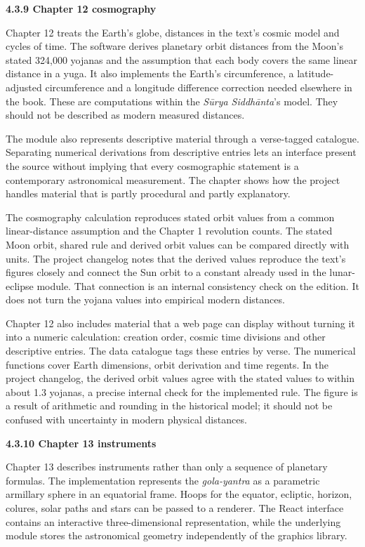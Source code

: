 \documentclass[
]{article}
\begin{document}
\textbf{4.3.9 Chapter 12 cosmography}

Chapter 12 treats the Earth's globe, distances in the text's cosmic
model and cycles of time. The software derives planetary orbit distances
from the Moon's stated 324,000 yojanas and the assumption that each body
covers the same linear distance in a yuga. It also implements the
Earth's circumference, a latitude-adjusted circumference and a longitude
difference correction needed elsewhere in the book. These are
computations within the \emph{Sūrya Siddhānta}'s model. They should not
be described as modern measured distances.

The module also represents descriptive material through a verse-tagged
catalogue. Separating numerical derivations from descriptive entries
lets an interface present the source without implying that every
cosmographic statement is a contemporary astronomical measurement. The
chapter shows how the project handles material that is partly procedural
and partly explanatory.

The cosmography calculation reproduces stated orbit values from a common
linear-distance assumption and the Chapter 1 revolution counts. The
stated Moon orbit, shared rule and derived orbit values can be compared
directly with units. The project changelog notes that the derived values
reproduce the text's figures closely and connect the Sun orbit to a
constant already used in the lunar-eclipse module. That connection is an
internal consistency check on the edition. It does not turn the yojana
values into empirical modern distances.

Chapter 12 also includes material that a web page can display without
turning it into a numeric calculation: creation order, cosmic time
divisions and other descriptive entries. The data catalogue tags these
entries by verse. The numerical functions cover Earth dimensions, orbit
derivation and time regents. In the project changelog, the derived orbit
values agree with the stated values to within about 1.3 yojanas, a
precise internal check for the implemented rule. The figure is a result
of arithmetic and rounding in the historical model; it should not be
confused with uncertainty in modern physical distances.

\textbf{4.3.10 Chapter 13 instruments}

Chapter 13 describes instruments rather than only a sequence of
planetary formulas. The implementation represents the \emph{gola-yantra}
as a parametric armillary sphere in an equatorial frame. Hoops for the
equator, ecliptic, horizon, colures, solar paths and stars can be passed
to a renderer. The React interface contains an interactive
three-dimensional representation, while the underlying module stores the
astronomical geometry independently of the graphics library.
\end{document}
